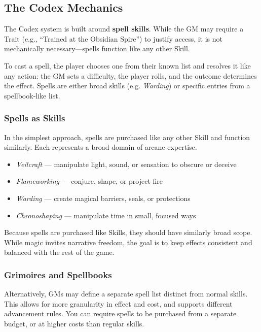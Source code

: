 \subsection{The Codex Mechanics}

The Codex system is built around \textbf{spell skills}. While the GM may require a Trait (e.g., “Trained at the Obsidian Spire”) to justify access, it is not mechanically necessary—spells function like any other Skill.

To cast a spell, the player chooses one from their known list and resolves it like any action: the GM sets a difficulty, the player rolls, and the outcome determines the effect. Spells are either broad skills (e.g. \textit{Warding}) or specific entries from a spellbook-like list.

\subsubsection{Spells as Skills}

In the simplest approach, spells are purchased like any other Skill and function similarly. Each represents a broad domain of arcane expertise.

\begin{WyrdExample}
    \begin{itemize}
        \item \textit{Veilcraft} — manipulate light, sound, or sensation to obscure or deceive  
        \item \textit{Flameworking} — conjure, shape, or project fire  
        \item \textit{Warding} — create magical barriers, seals, or protections  
        \item \textit{Chronoshaping} — manipulate time in small, focused ways  
    \end{itemize}
\end{WyrdExample}

Because spells are purchased like Skills, they should have similarly broad scope. While magic invites narrative freedom, the goal is to keep effects consistent and balanced with the rest of the game.

\subsubsection{Grimoires and Spellbooks}

Alternatively, GMs may define a separate spell list distinct from normal skills. This allows for more granularity in effect and cost, and supports different advancement rules. You can require spells to be purchased from a separate budget, or at higher costs than regular skills.

